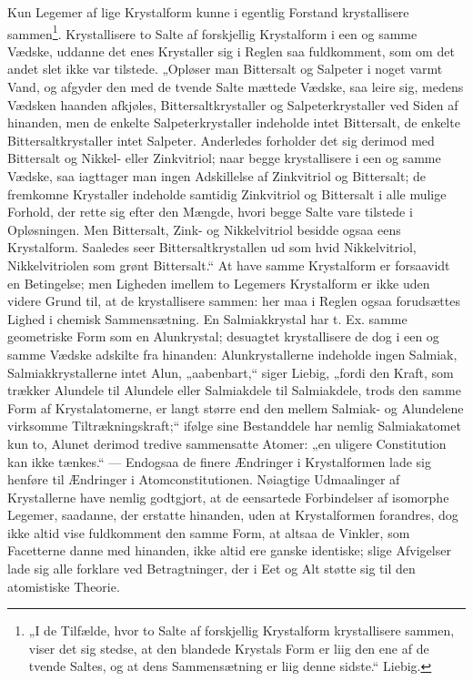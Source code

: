 \documentclass[12pt,a4paper]{book}
\begin{document}
Kun Legemer af lige Krystalform kunne i egentlig Forstand
krystallisere sammen\footnote{„I de Tilfælde, hvor to Salte af
forskjellig Krystalform krystallisere
sammen, viser det sig stedse, at den blandede Krystals Form er
liig den ene af de tvende Saltes, og at dens Sammensætning
er liig denne sidste.“ Liebig.}. Krystallisere to Salte af forskjellig
Krystalform i een og samme Vædske, uddanne det
enes Krystaller sig i Reglen saa fuldkomment, som om det
andet slet ikke var tilstede. „Opløser man Bittersalt og Salpeter
i noget varmt Vand, og afgyder den med de tvende
Salte mættede Vædske, saa leire sig, medens Vædsken
haanden afkjøles, Bittersaltkrystaller og Salpeterkrystaller
ved Siden af hinanden, men de enkelte Salpeterkrystaller indeholde
intet Bittersalt, de enkelte Bittersaltkrystaller intet Salpeter.
Anderledes forholder det sig derimod med Bittersalt
og Nikkel- eller Zinkvitriol; naar begge krystallisere i een og
samme Vædske, saa iagttager man ingen Adskillelse af Zinkvitriol
og Bittersalt; de fremkomne Krystaller indeholde samtidig
Zinkvitriol og Bittersalt i alle mulige Forhold, der
rette sig efter den Mængde, hvori begge Salte vare tilstede i
Opløsningen. Men Bittersalt, Zink- og Nikkelvitriol besidde
ogsaa eens Krystalform. Saaledes seer Bittersaltkrystallen ud
som hvid Nikkelvitriol, Nikkelvitriolen som grønt Bittersalt.“
At have samme Krystalform er forsaavidt en Betingelse;
men Ligheden imellem to Legemers Krystalform er ikke uden
videre Grund til, at de krystallisere sammen: her maa i
Reglen ogsaa forudsættes Lighed i chemisk Sammensætning.
En Salmiakkrystal har t. Ex. samme geometriske Form som
en Alunkrystal; desuagtet krystallisere de dog i een og samme
Vædske adskilte fra hinanden: Alunkrystallerne indeholde ingen
Salmiak, Salmiakkrystallerne intet Alun, „aabenbart,“ siger
Liebig, „fordi den Kraft, som trækker Alundele til Alundele
eller Salmiakdele til Salmiakdele, trods den samme Form
af Krystalatomerne, er langt større end den mellem Salmiak-
og Alundelene virksomme Tiltrækningskraft;“ ifølge sine Bestanddele
har nemlig Salmiakatomet kun to, Alunet derimod
tredive sammensatte Atomer: „en uligere Constitution kan ikke
tænkes.“ --- Endogsaa de finere Ændringer i Krystalformen lade
sig henføre til Ændringer i Atomconstitutionen. Nøiagtige
Udmaalinger af Krystallerne have nemlig godtgjort, at de
eensartede Forbindelser af isomorphe Legemer, saadanne, der
erstatte hinanden, uden at Krystalformen forandres, dog ikke
altid vise fuldkomment den samme Form, at altsaa de
Vinkler, som Facetterne danne med hinanden, ikke altid ere
ganske identiske; slige Afvigelser lade sig alle forklare ved
\setcounter{footnote}{0}
Betragtninger, der i Eet og Alt støtte sig til den atomistiske
Theorie.
\end{document}
